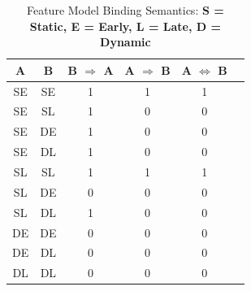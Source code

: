 \documentclass[conference]{IEEEtran}
\begin{document}
\begin{table}[H]
\caption{Feature Model Binding Semantics: \textbf{S = Static, E = Early, L = Late, D = Dynamic}}
\begin{center}
\begin{tabular}{c c c c c c}
\hline
    A & B & B $ \Rightarrow $ A & A $ \Rightarrow $ B & A $ \Leftrightarrow $ B \\\hline
         SE & SE & 1 & 1 & 1  \\ \hline
         SE & SL & 1 & 0 & 0  \\ \hline
         SE & DE & 1 & 0 & 0 \\ \hline
         SE & DL & 1 & 0 & 0 \\ \hline
          
         SL & SL & 1 & 1 & 1 \\ \hline
         SL & DE & 0 & 0 & 0 \\ \hline
         SL & DL & 1 & 0 & 0 \\ \hline
         
         DE & DE & 0 & 0 & 0 \\ \hline
         DE & DL & 0 & 0 & 0 \\ \hline
         
         DL & DL & 0 & 0 & 0 \\ \hline
         
\end{tabular}
\label{tab:timoconf}
\end{center}
\end{table}
\end{document}
